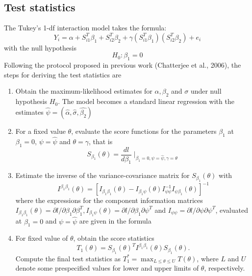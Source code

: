 \documentclass[12pt]{article}
\begin{document}
\subsection{Test statistics}
The Tukey's 1-df interaction model takes the formula:
\begin{displaymath}
Y_i = \alpha + S_{i1}^T\beta_1 + S_{i2}^T\beta_2 + \gamma (S_{i1}^T\beta_1) (S_{i2}^T\beta_2) + e_i
\end{displaymath}
with the null hypothesis
$$
H_0: \beta_1 = 0
$$
Following the protocol proposed in previous work (Chatterjee et al., 2006), the steps for deriving the test statistics are
\begin{enumerate}
    \item Obtain the maximum-likelihood estimates for $\alpha, \beta_2$ and $\sigma$ under null hypothesis $H_0$. The model becomes a standard linear regression with the estimates $\hat{\psi} = (\hat{\alpha}, \hat{\sigma}, \hat{\beta_2})$
    \item For a fixed value $\theta$, evaluate the score functions for the parameters $\beta_1$ at $\beta_1 = 0$, $\psi = \hat{\psi}$ and $\theta = \gamma$, that is
    $$
    S_{\beta_1}(\theta) = \frac{dl}{d\beta_1}\mid_{\beta_1 = 0, \psi = \hat{\psi}, \gamma = \theta}
    $$
    \item Estimate the inverse of the variance-covariance matrix for $S_{\beta_1}(\theta)$ with
    $$
    I^{\beta_1 \beta_1}(\theta)=\left[I_{\beta_1 \beta_1}(\theta)-I_{\beta_1 \psi}(\theta) I_{\psi \psi}^{-1} I_{\psi \beta_1}(\theta)\right]^{-1}
    $$ 
    where the expressions for the component information matrices $I_{\beta_1 \beta_1}(\theta)=\partial l / \partial \beta_1 \partial \beta_1^T, I_{\beta_1 \psi}(\theta)=\partial l / \partial \beta_1 \partial \psi^T$ and $I_{\psi \psi}=\partial l / \partial \psi \partial \psi^T$, evaluated at $\beta_1=0$ and $\psi=\hat{\psi}$ are given in the formula
    \item For fixed value of $\theta$, obtain the score statistics
    $$
    T_1(\theta)=S_{\beta_1}(\theta)^T I^{\beta_1 \beta_1}(\theta) S_{\beta_1}(\theta).
    $$
    Compute the final test statistics as $T_1^*=\max _{L \leq \theta \leq U} T(\theta)$, where $L$ and $U$ denote some prespecified values for lower and upper limits of $\theta$, respectively.
\end{enumerate}
\end{document}
